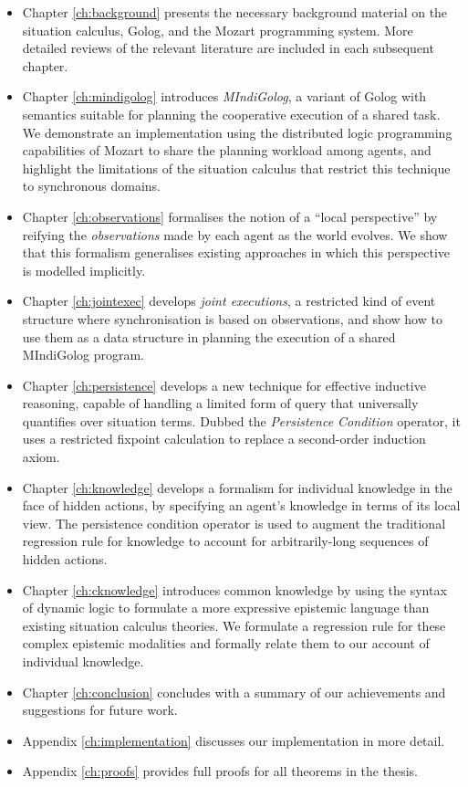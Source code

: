 \begin{itemize}
\item Chapter \ref{ch:background} presents the necessary background material
on the situation calculus, Golog, and the Mozart programming system.
More detailed reviews of the relevant literature are included in each
subsequent chapter. 
\item Chapter \ref{ch:mindigolog} introduces \emph{MIndiGolog}, a variant
of Golog with semantics suitable for planning the cooperative execution
of a shared task\emph{.} We demonstrate an implementation using the
distributed logic programming capabilities of Mozart to share the
planning workload among agents, and highlight the limitations of the
situation calculus that restrict this technique to synchronous domains. 
\item Chapter \ref{ch:observations} formalises the notion of a {}``local
perspective'' by reifying the \emph{observations} made by each agent
as the world evolves. We show that this formalism generalises existing
approaches in which this perspective is modelled implicitly. 
\item Chapter \ref{ch:jointexec} develops \emph{joint executions}, a restricted
kind of event structure where synchronisation is based on observations,
and show how to use them as a data structure in planning the execution
of a shared MIndiGolog program. 
\item Chapter \ref{ch:persistence} develops a new technique for effective
inductive reasoning, capable of handling a limited form of query that
universally quantifies over situation terms. Dubbed the \emph{Persistence
Condition} operator, it uses a restricted fixpoint calculation to
replace a second-order induction axiom. 
\item Chapter \ref{ch:knowledge} develops a formalism for individual knowledge
in the face of hidden actions, by specifying an agent's knowledge
in terms of its local view. The persistence condition operator is
used to augment the traditional regression rule for knowledge to account
for arbitrarily-long sequences of hidden actions. 
\item Chapter \ref{ch:cknowledge} introduces common knowledge by using
the syntax of dynamic logic to formulate a more expressive epistemic
language than existing situation calculus theories. We formulate a
regression rule for these complex epistemic modalities and formally
relate them to our account of individual knowledge. 
\item Chapter \ref{ch:conclusion} concludes with a summary of our achievements
and suggestions for future work. 
\item Appendix \ref{ch:implementation} discusses our implementation in
more detail. 
\item Appendix \ref{ch:proofs} provides full proofs for all theorems in
the thesis. 
\end{itemize}
